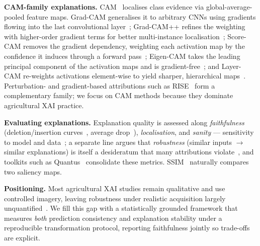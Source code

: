 \documentclass[runningheads]{llncs}
\begin{document}
\smallskip
\noindent\textbf{CAM-family explanations.}
CAM~\cite{zhou2016cam} localises class evidence via global-average-pooled feature
maps. Grad-CAM generalises it to arbitrary CNNs using gradients flowing into the
last convolutional layer~\cite{selvaraju2020gradcam}; Grad-CAM++ refines the
weighting with higher-order gradient terms for better multi-instance
localisation~\cite{chattopadhay2018gradcampp}; Score-CAM removes the gradient
dependency, weighting each activation map by the confidence it induces through a
forward pass~\cite{wang2020scorecam}; Eigen-CAM takes the leading principal
component of the activation maps and is gradient-free~\cite{muhammad2020eigencam};
and Layer-CAM re-weights activations element-wise to yield sharper, hierarchical
maps~\cite{jiang2021layercam}. Perturbation- and gradient-based attributions such
as RISE~\cite{petsiuk2018rise} form a complementary family; we focus on CAM
methods because they dominate agricultural XAI practice.

\smallskip
\noindent\textbf{Evaluating explanations.}
Explanation quality is assessed along \emph{faithfulness} (deletion/insertion
curves~\cite{petsiuk2018rise}, average drop~\cite{chattopadhay2018gradcampp}),
\emph{localisation}, and \emph{sanity} --- sensitivity to model and
data~\cite{adebayo2018sanity}; a separate line argues that \emph{robustness}
(similar inputs $\rightarrow$ similar explanations) is itself a desideratum that
many attributions violate~\cite{alvarez2018robustness,ghorbani2019fragile}, and
toolkits such as Quantus~\cite{hedstrom2023quantus} consolidate these metrics.
SSIM~\cite{wang2004ssim} naturally compares two saliency maps.

\smallskip
\noindent\textbf{Positioning.}
Most agricultural XAI studies remain qualitative and use controlled imagery,
leaving robustness under realistic acquisition largely
unquantified~\cite{hamdaoui2026review,arrieta2020xai}. We fill this gap with a
statistically grounded framework that measures \emph{both} prediction consistency
and explanation stability under a reproducible transformation protocol, reporting
faithfulness jointly so trade-offs are explicit.

\end{document}

